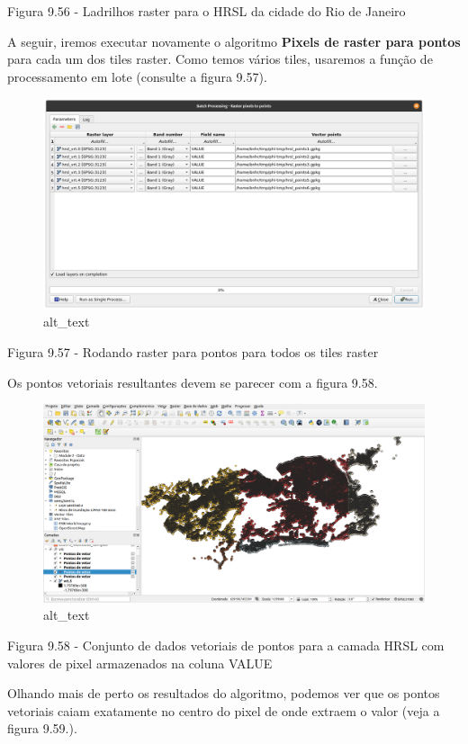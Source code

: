 \documentclass[
  portuguese,
]{krantz}
\begin{document}
Figura 9.56 - Ladrilhos raster para o HRSL da cidade do Rio de Janeiro

A seguir, iremos executar novamente o algoritmo \textbf{Pixels de raster para pontos} para cada um dos tiles raster. Como temos vários tiles, usaremos a função de processamento em lote (consulte a figura 9.57).

\begin{figure}
\centering
\includegraphics{media/modulo9/fig957.png}
\caption{alt\_text}
\end{figure}

Figura 9.57 - Rodando raster para pontos para todos os tiles raster

Os pontos vetoriais resultantes devem se parecer com a figura 9.58.

\begin{figure}
\centering
\includegraphics{media/modulo9/fig958.png}
\caption{alt\_text}
\end{figure}

Figura 9.58 - Conjunto de dados vetoriais de pontos para a camada HRSL com valores de pixel armazenados na coluna VALUE

Olhando mais de perto os resultados do algoritmo, podemos ver que os pontos vetoriais caiam exatamente no centro do pixel de onde extraem o valor (veja a figura 9.59.).
\end{document}
